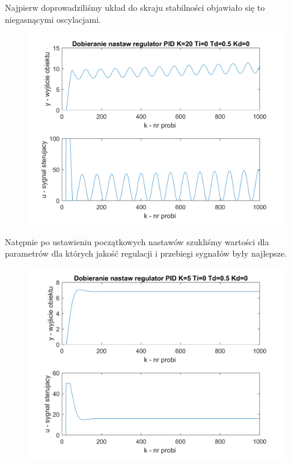 \documentclass[12pt, a4paper]{article}
\begin{document}
Najpierw doprowadziliśmy układ do skraju stabilności objawiało się to niegasnącymi oscylacjami.
\begin{figure}[H]
	\centering
	\includegraphics[width=0.9\linewidth]{pid_krytyczny.png}
	\caption{}
\end{figure}
Natępnie po ustawieniu początkowych nastawów szukliśmy wartości dla parametrów dla których jakość regulacji i przebiegi sygnałów były najlepsze. 
\begin{figure}[H]
	\centering
	\includegraphics[width=0.9\linewidth]{pid_1.png}
	\caption{}
\end{figure}
\end{document}
